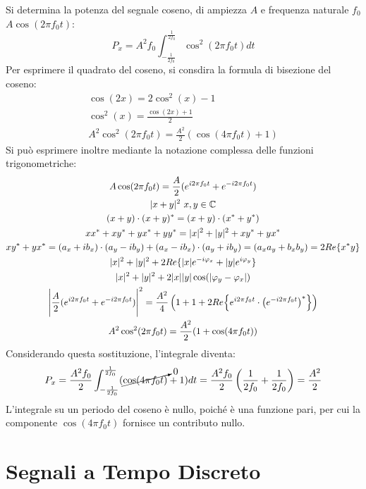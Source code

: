 \documentclass{article}
\numberwithin{equation}{subsection}
\begin{document}
Si determina la potenza del segnale coseno, di ampiezza $A$ e frequenza naturale $f_0$ $A\cos\left(2\pi f_0t\right)$:
\begin{equation*}
    P_x=\displaystyle A^2f_0\int_{-\frac{1}{2f_0}}^{\frac{1}{2f_0}}\cos^2(2\pi f_0 t)dt
\end{equation*}
Per esprimere il quadrato del coseno, si consdira la formula di bisezione del coseno:
\begin{gather*}
    \cos(2x)=2\cos^2(x)-1\\
    \cos^2(x)=\displaystyle\frac{\cos(2x)+1}{2}\\
    A^2\cos^2(2\pi f_0t)=\displaystyle\frac{A^2}{2}(\cos(4\pi f_0t)+1)
\end{gather*}
Si può esprimere inoltre mediante la notazione complessa delle funzioni trigonometriche:
\begin{gather*}
    A\cos(2\pi f_0t)=\displaystyle\frac{A}{2}(e^{i2\pi f_0t}+e^{-i2\pi f_0t})\\
    |x+y|^2\,\,x,y\in\mathbb{C}\\
    (x+y)\cdot(x+y)^*=(x+y)\cdot(x^*+y^*)\\
    xx^*+xy^*+yx^*+yy^*=|x|^2+|y|^2+xy^*+yx^*\\
    xy^*+yx^*=(a_x+ib_x)\cdot(a_y-ib_y)+(a_x-ib_x)\cdot(a_y+ib_y)=(a_xa_y+b_xb_y)=2Re\{x^*y\}\\
    |x|^2+|y|^2+2Re\{|x|e^{-i\varphi_x}+|y|e^{i\varphi_y}\}\\
    |x|^2+|y|^2+2|x||y|\cos(|\varphi_y-\varphi_x|)\\
    \Bigg|\displaystyle\frac{A}{2}(e^{i2\pi f_0t}+e^{-i2\pi f_0t})\Bigg|^2=\frac{A^2}{4}\left(1+1+2Re\Bigl\{e^{i2\pi f_0t}\cdot\left(e^{-i2\pi f_0t}\right)^*\Bigr\}\right)\\
    A^2\cos^2(2\pi f_0t)=\displaystyle\frac{A^2}{2}(1+\cos(4\pi f_0t))
\end{gather*}
Considerando questa sostituzione, l'integrale diventa:
\begin{equation*}
    P_x=\displaystyle\frac{A^2f_0}{2}\int_{-\frac{1}{2f_0}}^{\frac{1}{2f_0}}(\cancelto{0}{\cos(4\pi f_0 t)}+1)dt=\frac{A^2f_0}{2}\left(\frac{1}{2f_0}+\frac{1}{2f_0}\right)=\frac{A^2}{2}
\end{equation*}
L'integrale su un periodo del coseno è nullo, poiché è una funzione pari, per cui la componente $\cos(4\pi f_0 t)$ fornisce un contributo nullo. 

\clearpage

\section{Segnali a Tempo Discreto}
\end{document}
